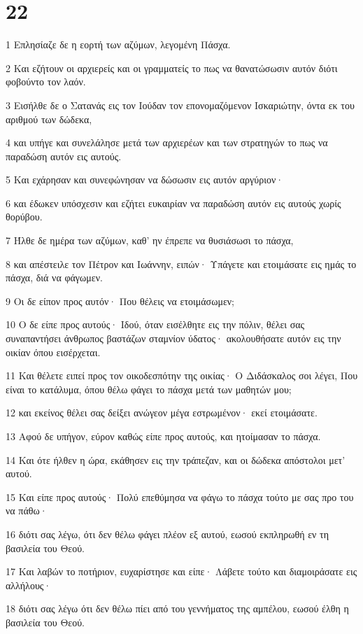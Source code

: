 \chapter{22}

\par 1 Επλησίαζε δε η εορτή των αζύμων, λεγομένη Πάσχα.
\par 2 Και εζήτουν οι αρχιερείς και οι γραμματείς το πως να θανατώσωσιν αυτόν διότι φοβούντο τον λαόν.
\par 3 Εισήλθε δε ο Σατανάς εις τον Ιούδαν τον επονομαζόμενον Ισκαριώτην, όντα εκ του αριθμού των δώδεκα,
\par 4 και υπήγε και συνελάλησε μετά των αρχιερέων και των στρατηγών το πως να παραδώση αυτόν εις αυτούς.
\par 5 Και εχάρησαν και συνεφώνησαν να δώσωσιν εις αυτόν αργύριον·
\par 6 και έδωκεν υπόσχεσιν και εζήτει ευκαιρίαν να παραδώση αυτόν εις αυτούς χωρίς θορύβου.
\par 7 Ήλθε δε ημέρα των αζύμων, καθ' ην έπρεπε να θυσιάσωσι το πάσχα,
\par 8 και απέστειλε τον Πέτρον και Ιωάννην, ειπών· Υπάγετε και ετοιμάσατε εις ημάς το πάσχα, διά να φάγωμεν.
\par 9 Οι δε είπον προς αυτόν· Που θέλεις να ετοιμάσωμεν;
\par 10 Ο δε είπε προς αυτούς· Ιδού, όταν εισέλθητε εις την πόλιν, θέλει σας συναπαντήσει άνθρωπος βαστάζων σταμνίον ύδατος· ακολουθήσατε αυτόν εις την οικίαν όπου εισέρχεται.
\par 11 Και θέλετε ειπεί προς τον οικοδεσπότην της οικίας· Ο Διδάσκαλος σοι λέγει, Που είναι το κατάλυμα, όπου θέλω φάγει το πάσχα μετά των μαθητών μου;
\par 12 και εκείνος θέλει σας δείξει ανώγεον μέγα εστρωμένον· εκεί ετοιμάσατε.
\par 13 Αφού δε υπήγον, εύρον καθώς είπε προς αυτούς, και ητοίμασαν το πάσχα.
\par 14 Και ότε ήλθεν η ώρα, εκάθησεν εις την τράπεζαν, και οι δώδεκα απόστολοι μετ' αυτού.
\par 15 Και είπε προς αυτούς· Πολύ επεθύμησα να φάγω το πάσχα τούτο με σας προ του να πάθω·
\par 16 διότι σας λέγω, ότι δεν θέλω φάγει πλέον εξ αυτού, εωσού εκπληρωθή εν τη βασιλεία του Θεού.
\par 17 Και λαβών το ποτήριον, ευχαρίστησε και είπε· Λάβετε τούτο και διαμοιράσατε εις αλλήλους·
\par 18 διότι σας λέγω ότι δεν θέλω πίει από του γεννήματος της αμπέλου, εωσού έλθη η βασιλεία του Θεού.

